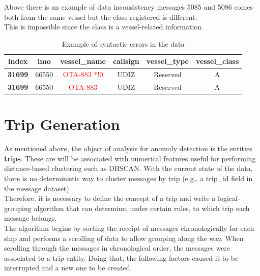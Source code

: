     Above there is an example of data inconsistency messages 5085 and 5086 comes both from the same vessel but the class registered is different.
    \\
    This is impossible since the class is a vessel-related information.
    
    
    \bigbreak
    
    \begin{table}[H]
    \begin{tabular}{|c|c|c|c|c|c|}
        \hline
            \textbf{index} & \textbf{imo} & \textbf{vessel\_name} & \textbf{callsign} & \textbf{vessel\_type} & \textbf{vessel\_class} \\
        \hline
            \textbf{31699} & 66550      & \textcolor{red}{OTA-883 *!0}   & UDIZ              & Reserved               & A      \\
            \textbf{31699} & 66550      & \textcolor{red}{OTA-883}   & UDIZ              & Reserved               & A      \\
        \hline
    \end{tabular}
    \caption{Example of syntactic errors in the data}
    \end{table}

\clearpage

\clearpage

\section{Trip Generation}
\label{sec:trips}

    As mentioned above, the object of analysis for anomaly detection is the entities \textbf{trips}. These are will be associated with numerical features useful for performing distance-based clustering such as DBSCAN. With the current state of the data, there is no deterministic way to cluster messages by trip (e.g., a trip\_id field in the message dataset).
    \\
    Therefore, it is necessary to define the concept of a trip and write a logical-grouping algorithm that can determine, under certain rules, to which trip each message belongs.
    \\
    The algorithm begins by sorting the receipt of messages chronologically for each ship and performs a scrolling of data to allow grouping along the way.
    When scrolling through the messages in chronological order, the messages were associated to a trip entity. Doing that, the following factors caused it to be interrupted and a new one to be created.
    
